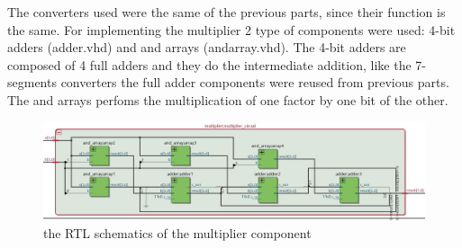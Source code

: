 \documentclass[12pt]{article}
\begin{document}
The converters used were the same of the previous parts, since their function is the same.
For implementing the multiplier 2 type of components were used: 4-bit adders (adder.vhd) and and arrays (and\textunderscore array.vhd).
The 4-bit adders are composed of 4 full adders and they do the intermediate addition, like the 7-segments converters the full adder components were reused from previous parts.
The and arrays perfoms the multiplication of one factor by one bit of the other.
\begin{figure}[h]
	\centering
	\includegraphics[scale = 0.3]{immagini/RTL_multiplier.jpg}
	\caption{the RTL schematics of the multiplier component}       

\end{figure}
\end{document}
